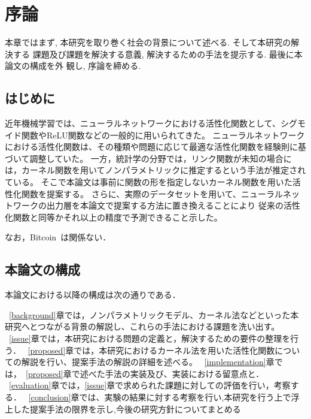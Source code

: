 \chapter{序論}
\label{introduction}

本章ではまず, 本研究を取り巻く社会の背景について述べる. そして本研究の解決する
課題及び課題を解決する意義, 解決するための手法を提示する. 最後に本論文の構成を外
観し, 序論を締める.

\section{はじめに}
\label{introduction:background}

近年機械学習では、ニューラルネットワークにおける活性化関数として、シグモイド関数やReLU関数などの一般的に用いられてきた。
ニューラルネットワークにおける活性化関数は、その種類や問題に応じて最適な活性化関数を経験則に基づいて調整していた。
一方，統計学の分野では，リンク関数が未知の場合には，カーネル関数を用いてノンパラメトリックに推定するという手法が推定されている。
そこで本論文は事前に関数の形を指定しないカーネル関数を用いた活性化関数を提案する。
さらに、実際のデータセットを用いて、ニューラルネットワークの出力層を本論文で提案する方法に置き換えることにより
従来の活性化関数と同等かそれ以上の精度で予測できること示した。


なお，Bitcoin~\cite{Bitcoin}は関係ない．

\section{本論文の構成}

本論文における以降の構成は次の通りである．

~\ref{background}章では，ノンパラメトリックモデル、カーネル法などといった本研究へとつながる背景の解説し、これらの手法における課題を洗い出す。
~\ref{issue}章では，本研究における問題の定義と，解決するための要件の整理を行う．
~\ref{proposed}章では，本研究におけるカーネル法を用いた活性化関数についての解説を行い、提案手法の解説の詳細を述べる。
~\ref{implementation}章では，~\ref{proposed}章で述べた手法の実装及び、実装における留意点と．
~\ref{evaluation}章では，\ref{issue}章で求められた課題に対しての評価を行い，考察する．
~\ref{conclusion}章では、実験の結果に対する考察を行い,本研究を行う上で浮上した提案手法の限界を示し,今後の研究方針についてまとめる






